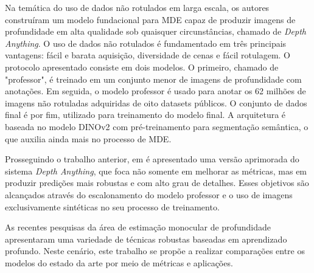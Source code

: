 Na temática do uso de dados não rotulados em larga escala, os autores  construíram um modelo fundacional para MDE capaz de produzir imagens de profundidade em alta qualidade sob quaisquer circunstâncias, chamado de \textit{Depth Anything}. O uso de dados não rotulados é fundamentado em três principais vantagens: fácil e barata aquisição, diversidade de cenas e fácil rotulagem. O protocolo apresentado consiste em dois modelos. O primeiro, chamado de "professor", é treinado em um conjunto menor de imagens de profundidade com anotações. Em seguida, o modelo professor é usado para anotar os 62 milhões de imagens não rotuladas adquiridas de oito datasets públicos. O conjunto de dados final é por fim, utilizado para treinamento do modelo final. A arquitetura é baseada no modelo DINOv2 com pré-treinamento para segmentação semântica, o que auxilia ainda mais no processo de MDE.

Prosseguindo o trabalho anterior, em \cite{yang2024depth} é apresentado uma versão aprimorada do sistema \textit{Depth Anything}, que foca não somente em melhorar as métricas, mas em produzir predições mais robustas e com alto grau de detalhes. Esses objetivos são alcançados através do escalonamento do modelo professor e o uso de imagens exclusivamente sintéticas no seu processo de treinamento. 


As recentes pesquisas da área de estimação monocular de profundidade apresentaram uma variedade de técnicas robustas baseadas em aprendizado profundo. Neste cenário, este trabalho se propõe a realizar comparações entre os modelos do estado da arte por meio de métricas e aplicações.
